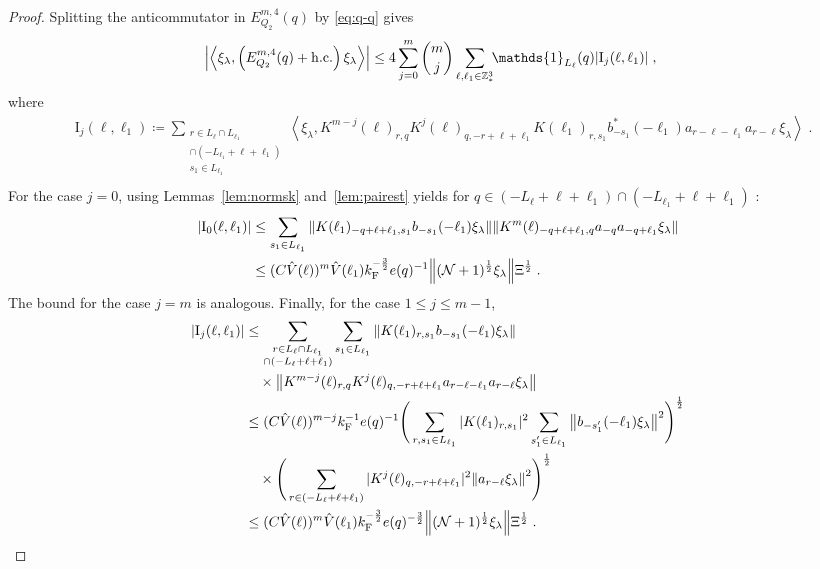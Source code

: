 \documentclass[12pt,a4paper]{article}
\numberwithin{equation}{section}
\newcommand{\1}{\mathbb{I}}
\newcommand{\F}{\mathrm{F}}
\newcommand{\I}{\mathrm{I}}
\newcommand{\Z}{\mathbb{Z}}
\newcommand{\NN}{\mathcal{N}}
\newcommand{\half}{\frac{1}{2}}
\newcommand{\eva}[1]{\left\langle #1 \right\rangle}
\theoremstyle{plain}
\theoremstyle{definition}
\theoremstyle{remark}
\theoremstyle{plain}
\theoremstyle{definition}
\theoremstyle{remark}
\begin{document}
\begin{proof}
Splitting the anticommutator in $ E^{m,4}_{Q_2}(q) $ by \eqref{eq:q-q} gives
\begin{equation} \label{eq:EQ2171}
\begin{aligned}
	& \abs{\eva{\xi_\lambda,\left(E^{m,4}_{Q_2}(q) + \mathrm{h.c.}\right) \xi_\lambda }}
	\le 4 \sum_{j=0}^m {{m}\choose j} \sum_{\ell,\ell_1 \in \Z^3_*}\!\! \mathds{1}_{L_\ell}(q) |\I_j(\ell, \ell_1)| \;,
	\end{aligned}
\end{equation}
where
\begin{equation}
\begin{aligned}
	& \I_j(\ell, \ell_1)
	\coloneq \sum_{\substack{r\in L_{\ell} \cap L_{\ell_1}\\ \cap (-L_{\ell_1}+\ell+\ell_1)\\ s_1 \in L_{\ell_1}}}
		\eva{\xi_\lambda, K^{m-j}(\ell)_{r,q} K^{j}(\ell)_{q,-r+\ell+\ell_1} K(\ell_1)_{r,s_1} b^*_{-s_1}(-\ell_1) a_{r-\ell-\ell_1} a_{r-\ell} \xi_\lambda} \;. \\
\end{aligned}
\end{equation}
For the case $ j = 0 $, using Lemmas~\ref{lem:normsk} and~\ref{lem:pairest} yields for $ q \in (-L_\ell + \ell + \ell_1) \cap (-L_{\ell_1} + \ell + \ell_1) $ :
\begin{align}
	|\I_0(\ell, \ell_1)|
	&\leq \sum_{s_1 \in L_{\ell_1}}
		\norm{K(\ell_1)_{-q+\ell+\ell_1,s_1} b_{-s_1}(-\ell_1) \xi_\lambda}
		\norm{ K^m(\ell)_{-q+\ell+\ell_1,q}a_{-q}a_{-q+\ell_1} \xi_\lambda } \nonumber\\
	&\leq (C \hat{V}(\ell))^m
		\hat{V}(\ell_1)
		k_{\F}^{-\frac 32} e(q)^{-1}
		\norm{(\NN+1)^\half\xi_\lambda} \Xi^\half \;. \label{eq:estEQ2171}
\end{align}
The bound for the case $ j = m $ is analogous. Finally, for the case $ 1 \le j \le m-1 $,
\begin{align}
	|\I_j(\ell, \ell_1)|
	&\leq \sum_{\substack{r\in L_{\ell} \cap L_{\ell_1} \\ \cap (-L_{\ell}+\ell+\ell_1)}}
		\sum_{s_1\in L_{\ell_1}} \norm{K(\ell_1)_{r,s_1} b_{-s_1}(-\ell_1) \xi_\lambda} \\
		& \quad \times \norm{ K^{m-j}(\ell)_{r,q} K^j(\ell)_{q,-r+\ell+\ell_1} a_{r-\ell-\ell_1} a_{r-\ell} \xi_\lambda } \nonumber\\
	&\leq (C \hat{V}(\ell))^{m-j} k_{\F}^{-1} e(q)^{-1}
		\Bigg( \sum_{r,s_1\in L_{\ell_1}}
		|K(\ell_1)_{r,s_1}|^2
		\sum_{s_1'\in L_{\ell_1}}
		\norm{b_{-s_1'}(-\ell_1) \xi_\lambda}^2 \Bigg)^{\half} \nonumber\\
		&\quad \times \Bigg( \sum_{r\in (-L_{\ell}+\ell+\ell_1)}
		|K^j(\ell)_{q,-r+\ell+\ell_1}|^2
		\norm{ a_{r-\ell} \xi_\lambda }^2 \Bigg)^{\half} \nonumber\\
	&\leq (C \hat{V}(\ell))^m
		\hat{V}(\ell_1)
		k_{\F}^{-\frac 32} e(q)^{-\frac 32}
		\norm{(\NN+1)^\half\xi_\lambda} \Xi^{\half} \;. \qedhere \nonumber
\end{align}
\end{proof}
\end{document}
